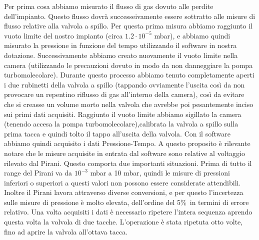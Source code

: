 \documentclass[11pt]{article}
\begin{document}
Per prima cosa abbiamo misurato il flusso di gas dovuto alle perdite dell'impianto. Questo flusso dovrà successeivamente essere sottratto alle misure di flusso relative alla valvola a spillo. Per questa prima misura abbiamo raggiunto il vuoto limite del nostro impianto (circa $1.2\cdot10^{-5}$ mbar), e abbiamo quindi misurato la pressione in funzione del tempo utilizzando il software in nostra dotazione.
Successivamente abbiamo creato nuovamente il vuoto limite nella camera (utilizzando le precauzioni dovuto in modo da non danneggiare la pompa turbomolecolare). Durante questo processo abbiamo tenuto completamente aperti i due rubinetti della valvola a spillo (tappando ovviamente l'uscita così da non provocare un repentino riflusso di gas all'interno della camera), così da evitare che si creasse un volume morto nella valvola che avrebbe poi pesantemente inciso sui primi dati acquisiti. Raggiunto il vuoto limite abbiamo sigillato la camera (tenendo accesa la pompa turbomolecolare),calibrata la valvola a spillo sulla prima tacca e quindi tolto il tappo all'uscita della valvola. Con il software abbiamo quindi acquisito i dati Pressione-Tempo. 
A questo proposito è rilevante notare che le misure acquisite in entrata dal software sono relative al voltaggio rilevato dal Pirani. Questo comporta due importanti situazioni. Prima di tutto il range del Pirani va da $10^{-3}$ mbar a 10 mbar, quindi le misure di pressioni inferiori o superiori a questi valori non possono essere considerate attendibili. Inoltre il Pirani lavora attraverso diverse conversioni, e per questo l'incertezza sulle misure di pressione è molto elevata, dell'ordine del 5\%\ in termini di errore relativo. 
Una volta acquisiti i dati è necessario ripetere l'intera sequenza aprendo questa volta la volvola di due tacche. L'operazione è stata ripetuta otto volte, fino ad aprire la valvola all'ottava tacca.  
\end{document}
